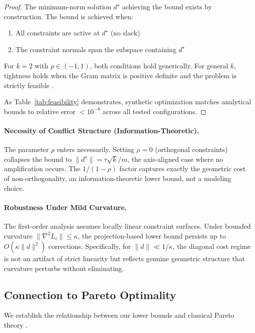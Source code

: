 \documentclass{article}
\theoremstyle{plain}
\theoremstyle{definition}
\theoremstyle{remark}
\begin{document}
\begin{proof}
The minimum-norm solution $d^\star$ achieving the bound exists by construction. The bound is achieved when:
\begin{enumerate}
    \item All constraints are active at $d^\star$ (no slack)
    \item The constraint normals span the subspace containing $d^\star$
\end{enumerate}
For $k=2$ with $\rho \in (-1,1)$, both conditions hold generically. For general $k$, tightness holds when the Gram matrix is positive definite and the problem is strictly feasible \citep[Thm.~5.2.1]{boyd2004convex}.

As Table~\ref{tab:feasibility} demonstrates, synthetic optimization matches analytical bounds to relative error $< 10^{-8}$ across all tested configurations.
\end{proof}

\paragraph{Necessity of Conflict Structure (Information-Theoretic).}
The parameter $\rho$ enters necessarily. Setting $\rho = 0$ (orthogonal constraints) collapses the bound to $\|d^\star\| = \tau\sqrt{k}/m$, the axis-aligned case where no amplification occurs. The $1/(1-\rho)$ factor captures exactly the geometric cost of non-orthogonality, an information-theoretic lower bound, not a modeling choice.

\paragraph{Robustness Under Mild Curvature.}
The first-order analysis assumes locally linear constraint surfaces. Under bounded curvature $\|\nabla^2 L_i\| \le \kappa$, the projection-based lower bound persists up to $O(\kappa\|d\|^2)$ corrections. Specifically, for $\|d\| \ll 1/\kappa$, the diagonal cost regime is not an artifact of strict linearity but reflects genuine geometric structure that curvature perturbs without eliminating.

\subsection{Connection to Pareto Optimality}\label{app:pareto}

We establish the relationship between our lower bounds and classical Pareto theory \citep{ehrgott2005multicriteria}.
\end{document}
